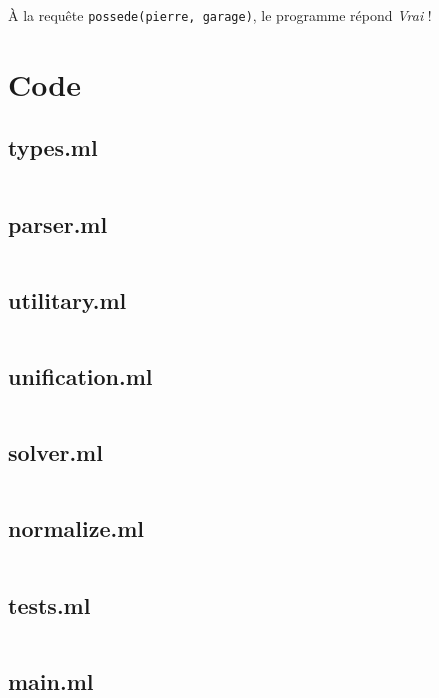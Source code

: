 \documentclass{article}
\newcommand\codefile[1]{\subsection{#1}\inputminted{ocaml}{../Code/#1}}
\begin{document}
À la requête \texttt{possede(pierre, garage)}, le programme répond \emph{Vrai} !




\appendix

\section{Code}
\codefile{types.ml}
\codefile{parser.ml}
\codefile{utilitary.ml}
\codefile{unification.ml}
\codefile{solver.ml}
\codefile{normalize.ml}
\codefile{tests.ml}
\codefile{main.ml}
\end{document}
